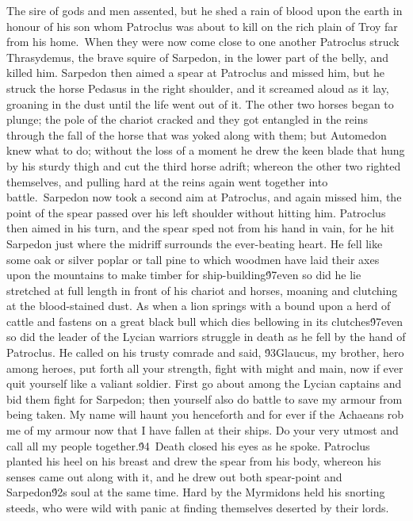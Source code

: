 {The sire of gods and men assented, but he shed a rain of blood upon the earth in honour of his son whom Patroclus was about to kill on the rich plain of Troy far from his home.\
When they were now come close to one another Patroclus struck Thrasydemus, the brave squire of Sarpedon, in the lower part of the belly, and killed him. Sarpedon then aimed a spear at Patroclus and missed him, but he struck the horse Pedasus in the right shoulder, and it screamed aloud as it lay, groaning in the dust until the life went out of it. The other two horses began to plunge; the pole of the chariot cracked and they got entangled in the reins through the fall of the horse that was yoked along with them; but Automedon knew what to do; without the loss of a moment he drew the keen blade that hung by his sturdy thigh and cut the third horse adrift; whereon the other two righted themselves, and pulling hard at the reins again went together into battle.\
Sarpedon now took a second aim at Patroclus, and again missed him, the point of the spear passed over his left shoulder without hitting him. Patroclus then aimed in his turn, and the spear sped not from his hand in vain, for he hit Sarpedon just where the midriff surrounds the ever-beating heart. He fell like some oak or silver poplar or tall pine to which woodmen have laid their axes upon the mountains to make timber for ship-building\'97even so did he lie stretched at full length in front of his chariot and horses, moaning and clutching at the blood-stained dust. As when a lion springs with a bound upon a herd of cattle and fastens on a great black bull which dies bellowing in its clutches\'97even so did the leader of the Lycian warriors struggle in death as he fell by the hand of Patroclus. He called on his trusty comrade and said, \'93Glaucus, my brother, hero among heroes, put forth all your strength, fight with might and main, now if ever quit yourself like a valiant soldier. First go about among the Lycian captains and bid them fight for Sarpedon; then yourself also do battle to save my armour from being taken. My name will haunt you henceforth and for ever if the Achaeans rob me of my armour now that I have fallen at their ships. Do your very utmost and call all my people together.\'94\
Death closed his eyes as he spoke. Patroclus planted his heel on his breast and drew the spear from his body, whereon his senses came out along with it, and he drew out both spear-point and Sarpedon\'92s soul at the same time. Hard by the Myrmidons held his snorting steeds, who were wild with panic at finding themselves deserted by their lords.\
}
